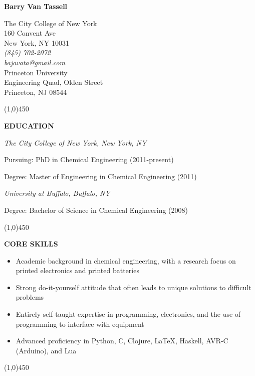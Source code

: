 \documentclass[9pt,letterpaper]{article}
\begin{document}
\begin{center}
  {\LARGE \textbf{Barry Van Tassell}}\\
  \begin{multicols}{3}
    {\small The City College of New York \\
    160 Convent Ave \\
  New York, NY 10031}\\
  \columnbreak
  \emph{\small (845) 702-2072\\
    bajavata@gmail.com}\\
  \columnbreak
    {\small Princeton University \\
    Engineering Quad, Olden Street \\
    Princeton, NJ 08544}
  \end{multicols}
  \line(1,0){450}
\end{center}

\onehalfspacing

{\singlespacing
\noindent \textbf{EDUCATION}
\newline
}
{\small
\indent \emph{The City College of New York, New York, NY}

\indent \indent Pursuing: PhD in Chemical Engineering (2011-present)

\indent \indent Degree: Master of Engineering in Chemical Engineering (2011)

\indent \emph{University at Buffalo, Buffalo, NY}

\indent \indent Degree: Bachelor of Science in Chemical Engineering (2008)
\begin{center}
  \line(1,0){450}
\end{center}
}

{\singlespacing
\noindent \textbf{CORE SKILLS}

{\small\begin{itemize}
\item Academic background in chemical engineering, with a research focus on printed electronics and printed batteries
\item Strong do-it-yourself attitude that often leads to unique solutions to difficult problems
\item Entirely self-taught expertise in programming, electronics, and the use of programming to interface with equipment
\item Advanced proficiency in Python, C, Clojure, \LaTeX, Haskell, AVR-C (Arduino), and Lua
\end{itemize}}}

\begin{center}
  \line(1,0){450}
\end{center}
\end{document}
